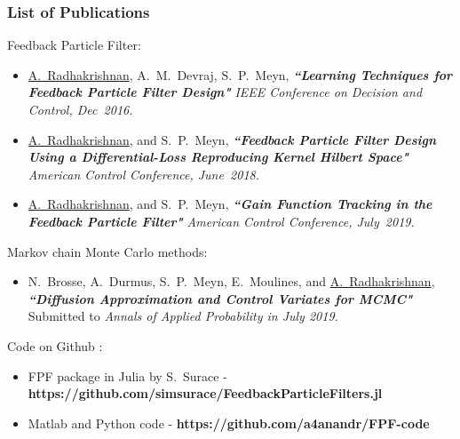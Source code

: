 \documentclass[xcolor=dvipsnames, subsection=false]{beamer}
\begin{document}
\begin{frame}
\frametitle{List of Publications}
\begin{minipage}[t][10cm][t]{\textwidth}
	\vspace{-0.2in}
			\begin{block}{\scriptsize Feedback Particle Filter:}
				\begin{itemize}
					\item {\tiny { {\underline{A.~Radhakrishnan}}, A.~M.~Devraj, S.~P.~Meyn, {\bf \textit{``Learning Techniques for Feedback Particle Filter Design"}} {{\emph{{IEEE Conference on Decision and Control, Dec~2016.}}}}}}
					\item {\tiny { {\underline{A.~Radhakrishnan}}, and S.~P.~Meyn, {\bf \textit{``Feedback Particle Filter Design Using a Differential-Loss Reproducing Kernel Hilbert Space"}} {{\emph{{American Control Conference, June~2018.}}}}}}
						\item {\tiny { {\underline{A.~Radhakrishnan}}, and S.~P.~Meyn, {\bf \textit{``Gain Function Tracking in the Feedback Particle Filter"}} {{\emph{{American Control Conference, July~2019.}}}}}}
				\end{itemize}
			\end{block}
				\begin{alertblock}{\scriptsize Markov chain Monte Carlo methods:}
					\begin{itemize}
						\item {\tiny { N.~Brosse, A.~Durmus,  S.~P.~Meyn, E.~Moulines, and {\underline{A.~Radhakrishnan}}, {\bf \textit{``Diffusion Approximation and Control Variates for MCMC"}} {{Submitted to \emph{{Annals of Applied Probability in July 2019.}}}}}}	
					\end{itemize}
				\end{alertblock}
\begin{block}{\scriptsize Code on Github {\faGithub}:}
\begin{itemize}
	\item {\tiny FPF package in Julia by S.~Surace - {\bf https://github.com/simsurace/FeedbackParticleFilters.jl}}
	\item {\tiny Matlab and Python code - {\bf https://github.com/a4anandr/FPF-code}}
\end{itemize}
\end{block}
\end{minipage}
\end{frame}
\end{document}
